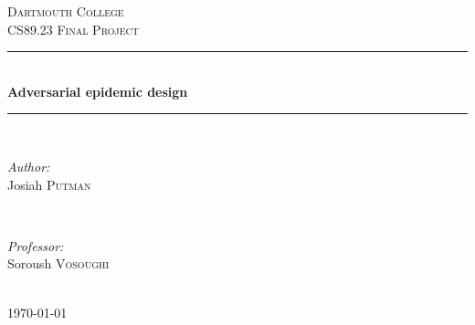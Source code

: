 \begin{titlepage}

\newcommand{\HRule}{\rule{\linewidth}{0.5mm}} %

\center %
    

\textsc{\LARGE Dartmouth College}\\[1.5cm] %
\textsc{\large CS89.23 Final Project}\\[0.5cm] %


\HRule \\[0.4cm]
{ \huge \bfseries Adversarial epidemic design}\\[0.4cm] %
\HRule \\[1.5cm]
    

\begin{minipage}{0.4\textwidth}
\begin{flushleft} \large
\emph{Author:}\\
Josiah \textsc{Putman} %
\end{flushleft}
\end{minipage}
~
\begin{minipage}{0.4\textwidth}
\begin{flushright} \large
\emph{Professor:} \\
Soroush \textsc{Vosoughi}
\end{flushright}
\end{minipage}\\[2cm]



{\large \today}\\[2cm] %



\end{titlepage}
